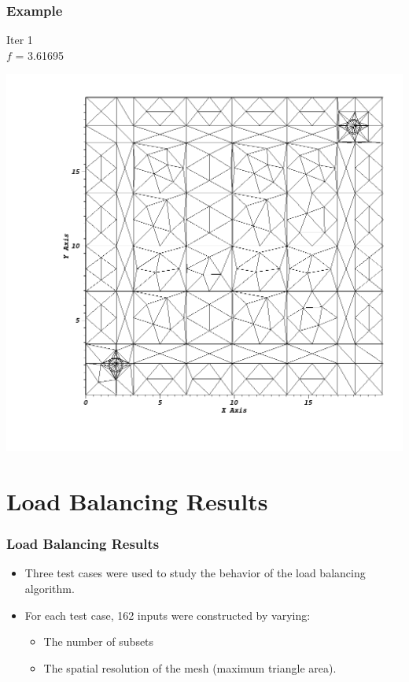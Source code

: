 \documentclass[compress]{beamer}
\begin{document}
\begin{frame}[t]\frametitle{Example}
\begin{minipage}{0.15\textwidth}
\begin{footnotesize}
Iter 1 \\
$f$ = 3.61695 
\end{footnotesize}
\end{minipage}
\begin{minipage}{0.8\textwidth}
\centering
\includegraphics[scale = 0.22]{figures/redistribute_after.png}
\end{minipage}
\end{frame}

\section{Load Balancing Results}
\begin{frame}[t]\frametitle{Load Balancing Results}
\begin{block}{}
\begin{itemize}
	\item Three test cases were used to study the behavior of the load balancing algorithm.
	\item For each test case, 162 inputs were constructed by varying:
		\begin{itemize}
		\item The number of subsets
		\item The spatial resolution of the mesh (maximum triangle area).
		\end{itemize}
\end{itemize}
\end{block}
\end{frame}
\end{document}
